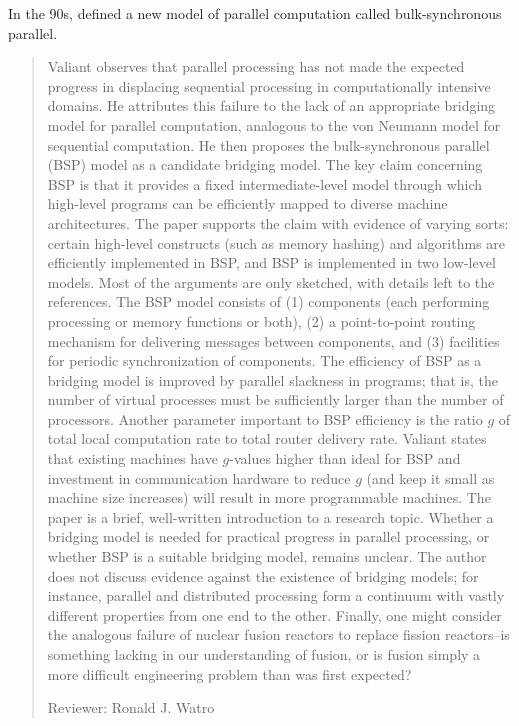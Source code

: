 In the 90s, \textcite{Valiant1990} defined a new model of parallel computation
called bulk-synchronous parallel.

\begin{quotation}
	
Valiant observes that parallel processing has not made the expected progress in
displacing sequential processing in computationally intensive domains. He
attributes this failure to the lack of an appropriate bridging model for
parallel computation, analogous to the von Neumann model for sequential
computation. He then proposes the bulk-synchronous parallel (BSP) model as a
candidate bridging model. The key claim concerning BSP is that it provides a
fixed intermediate-level model through which high-level programs can be
efficiently mapped to diverse machine architectures. The paper supports the
claim with evidence of varying sorts: certain high-level constructs (such as
memory hashing) and algorithms are efficiently implemented in BSP, and BSP is
implemented in two low-level models. Most of the arguments are only sketched,
with details left to the references. The BSP model consists of (1) components
(each performing processing or memory functions or both), (2) a point-to-point
routing mechanism for delivering messages between components, and (3)
facilities for periodic synchronization of components. The efficiency of BSP as
a bridging model is improved by parallel slackness in programs; that is, the
number of virtual processes must be sufficiently larger than the number of
processors. Another parameter important to BSP efficiency is the ratio $g$ of
total local computation rate to total router delivery rate. Valiant states that
existing machines have $g$-values higher than ideal for BSP and investment in
communication hardware to reduce $g$ (and keep it small as machine size
increases) will result in more programmable machines. The paper is a brief,
well-written introduction to a research topic. Whether a bridging model is
needed for practical progress in parallel processing, or whether BSP is a
suitable bridging model, remains unclear. The author does not discuss evidence
against the existence of bridging models; for instance, parallel and
distributed processing form a continuum with vastly different properties from
one end to the other. Finally, one might consider the analogous failure of
nuclear fusion reactors to replace fission reactors--is something lacking in our
understanding of fusion, or is fusion simply a more difficult engineering
problem than was first expected?   

Reviewer: Ronald J. Watro 
\end{quotation}

